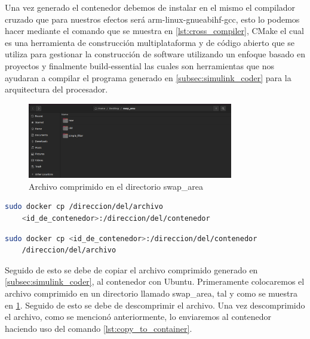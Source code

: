 Una vez generado el contenedor debemos de instalar en el mismo el compilador cruzado que para nuestros efectos será arm-linux-gnueabihf-gcc, esto lo podemos hacer mediante el comando que se muestra en \ref{lst:cross_compiler},  CMake el cual es una herramienta de construcción multiplataforma y de código abierto que se utiliza para gestionar la construcción de software utilizando un enfoque basado en proyectos y finalmente build-essential las cuales son herramientas que nos ayudaran a compilar el programa generado en \ref{subsec:simulink_coder} para la arquitectura del procesador.

\begin{figure}[h!]
    \centering
    \includegraphics[width=0.8\textwidth]{fig/especifico_2/paso_a_paso_mtmt/root_folder.png}
    \caption{Archivo comprimido en el directorio swap\_area}
    \label{fig:pestana_swap_area}
\end{figure}

\begin{lstlisting}[language=bash, caption={Comando para la copiar archivos al contenedor}, label=lst:copy_to_container]
    sudo docker cp /direccion/del/archivo 
    <id_de_contenedor>:/direccion/del/contenedor
\end{lstlisting}

\begin{lstlisting}[language=bash, caption={Comando para la copiar archivos del contenedor}, label=lst:copy_from_container]
    sudo docker cp <id_de_contenedor>:/direccion/del/contenedor
    /direccion/del/archivo
\end{lstlisting}

Seguido de esto se debe de copiar el archivo comprimido generado en \ref{subsec:simulink_coder}, al contenedor con Ubuntu. Primeramente colocaremos el archivo comprimido en un directorio llamado swap\_area, tal y como se muestra en \ref{fig:pestana_swap_area}. Seguido de esto se debe de descomprimir el archivo. Una vez descomprimido el archivo, como se mencionó anteriormente, lo enviaremos al contenedor haciendo uso del comando \ref{lst:copy_to_container}.

